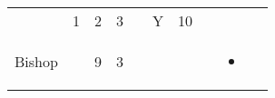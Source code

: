 \documentclass[12pt]{article}
\begin{document}
\begin{longtable}[]{@{}llllllllll@{}}
\begin{minipage}[t]{0.06\columnwidth}\raggedright\strut
\strut\end{minipage} &
\begin{minipage}[t]{0.06\columnwidth}\raggedright\strut
1
\strut\end{minipage} &
\begin{minipage}[t]{0.06\columnwidth}\raggedright\strut
2
\strut\end{minipage} &
\begin{minipage}[t]{0.06\columnwidth}\raggedright\strut
3
\strut\end{minipage} &
\begin{minipage}[t]{0.06\columnwidth}\raggedright\strut
\strut\end{minipage} &
\begin{minipage}[t]{0.07\columnwidth}\raggedright\strut
Y
\strut\end{minipage} &
\begin{minipage}[t]{0.08\columnwidth}\raggedright\strut
10
\strut\end{minipage}\tabularnewline
\begin{minipage}[t]{0.13\columnwidth}\raggedright\strut
Bishop
\strut\end{minipage} &
\begin{minipage}[t]{0.06\columnwidth}\raggedright\strut
\strut\end{minipage} &
\begin{minipage}[t]{0.06\columnwidth}\raggedright\strut
9
\strut\end{minipage} &
\begin{minipage}[t]{0.06\columnwidth}\raggedright\strut
3
\strut\end{minipage} &
\begin{minipage}[t]{0.06\columnwidth}\raggedright\strut
\strut\end{minipage} &
\begin{minipage}[t]{0.06\columnwidth}\raggedright\strut
\strut\end{minipage} &
\begin{minipage}[t]{0.06\columnwidth}\raggedright\strut
\strut\end{minipage} &
\begin{minipage}[t]{0.06\columnwidth}\raggedright\strut
\strut\end{minipage} &
\begin{minipage}[t]{0.07\columnwidth}\raggedright\strut
\begin{itemize}
\item

\end{itemize}
\end{minipage}
\end{longtable}
\end{document}
